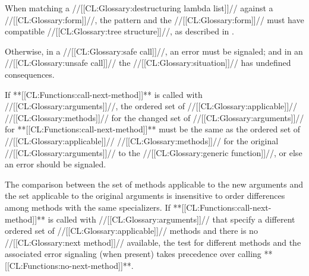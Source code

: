 
When matching a //[[CL:Glossary:destructuring lambda list]]// against a //[[CL:Glossary:form]]//, the pattern and the //[[CL:Glossary:form]]// must have compatible //[[CL:Glossary:tree structure]]//, as described in \secref\ExtraDestructureInfo.

Otherwise, in a //[[CL:Glossary:safe call]]//, an error  must be signaled; and in an //[[CL:Glossary:unsafe call]]// the //[[CL:Glossary:situation]]// has undefined consequences.


\endsubsubsection%


If **[[CL:Functions:call-next-method]]** is called with //[[CL:Glossary:arguments]]//, the ordered set of //[[CL:Glossary:applicable]]// //[[CL:Glossary:methods]]// for the changed set of //[[CL:Glossary:arguments]]// for **[[CL:Functions:call-next-method]]** must be the same as the ordered set of  //[[CL:Glossary:applicable]]// //[[CL:Glossary:methods]]// for the original //[[CL:Glossary:arguments]]// to the //[[CL:Glossary:generic function]]//, or else an error should be signaled.

The comparison between the set of methods applicable to the new arguments and the set applicable to the original arguments is insensitive to order differences among methods with the same specializers.
  If **[[CL:Functions:call-next-method]]** is called with //[[CL:Glossary:arguments]]// that specify a different ordered set of //[[CL:Glossary:applicable]]// methods and there is no  //[[CL:Glossary:next method]]// available, the test for different methods and the  associated error signaling (when present) takes precedence over calling **[[CL:Functions:no-next-method]]**.

\endsubsubsection%

\endsubSection%

